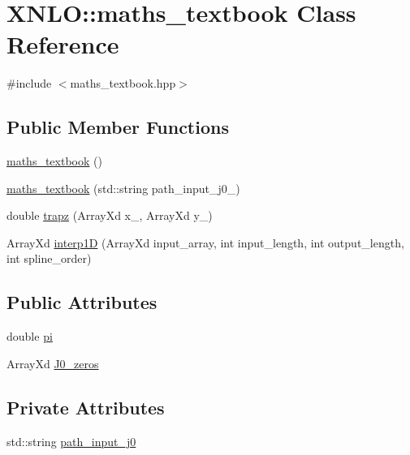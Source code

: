 \hypertarget{class_x_n_l_o_1_1maths__textbook}{}\section{X\+N\+LO\+:\+:maths\+\_\+textbook Class Reference}
\label{class_x_n_l_o_1_1maths__textbook}


{\ttfamily \#include $<$maths\+\_\+textbook.\+hpp$>$}

\subsection*{Public Member Functions}
\begin{DoxyCompactItemize}
\item 
\hyperlink{class_x_n_l_o_1_1maths__textbook_a5d6ac644a6473eb0ef1eabf77b7f3c13}{maths\+\_\+textbook} ()
\item 
\hyperlink{class_x_n_l_o_1_1maths__textbook_a650dad745c7da4fc6d285924c2a3e1a0}{maths\+\_\+textbook} (std\+::string path\+\_\+input\+\_\+j0\+\_\+)
\item 
double \hyperlink{class_x_n_l_o_1_1maths__textbook_a98c8e89cafc0d73fdeaacb71f76df80c}{trapz} (Array\+Xd x\+\_\+, Array\+Xd y\+\_\+)
\item 
Array\+Xd \hyperlink{class_x_n_l_o_1_1maths__textbook_a7cb134b6957f9b062e2176c0621885ab}{interp1D} (Array\+Xd input\+\_\+array, int input\+\_\+length, int output\+\_\+length, int spline\+\_\+order)
\end{DoxyCompactItemize}
\subsection*{Public Attributes}
\begin{DoxyCompactItemize}
\item 
double \hyperlink{class_x_n_l_o_1_1maths__textbook_aa8506848e319f99a4b40fe4a99af1af9}{pi}
\item 
Array\+Xd \hyperlink{class_x_n_l_o_1_1maths__textbook_a912d2ec75000ca64cb41118f9e1e5261}{J0\+\_\+zeros}
\end{DoxyCompactItemize}
\subsection*{Private Attributes}
\begin{DoxyCompactItemize}
\item 
std\+::string \hyperlink{class_x_n_l_o_1_1maths__textbook_adcff34ca6555b48649b0548cfb173f72}{path\+\_\+input\+\_\+j0}
\end{DoxyCompactItemize}


